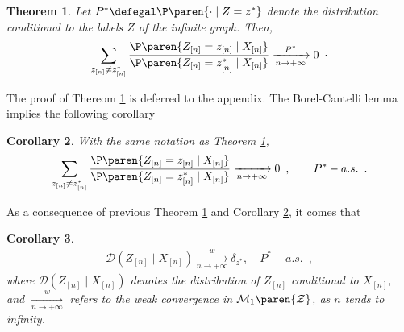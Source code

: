 \documentclass[11pt]{article}
\newtheorem{thm}{Theorem}[section]
\newtheorem{lem}[thm]{Lemma}
\newtheorem{cor}[thm]{Corollary}
\newcommand{\Xn}{X_{[n]}}
\newcommand{\Zn}{Z_{[n]}}
\newcommand{\zn}{z_{[n]}}
\begin{document}
\begin{thm}\label{thm.distrib.conv.zn}
Let $P^*\defegal\P\paren{\cdot\mid Z=z^*}$ denote the distribution  conditional to the labels $Z$ of the infinite graph. Then,
\begin{align*}
        \sum_{\zn\neq \zn^*}\frac{\P\paren{\Zn=\zn\mid \Xn}}{\P\paren{\Zn=\zn^*\mid \Xn}}\xrightarrow[n\to+\infty]{P^*}0\enspace\cdot
\end{align*}
\end{thm}
The proof of Thereom \ref{thm.distrib.conv.zn} is deferred to the appendix.
%
The Borel-Cantelli lemma implies the following corollary
\begin{cor} \label{cor.distrib.conv.as.zn} With the same notation as Theorem
\ref{thm.distrib.conv.zn},
\begin{align*}
\sum_{\zn\neq \zn^*}\frac{\P\paren{\Zn=\zn\mid \Xn}}{\P\paren{\Zn=\zn^*\mid \Xn}}\xrightarrow[n\to+\infty]{}0\enspace,\qquad P^*-a.s.\enspace.  
\end{align*}
\end{cor}





As a consequence of previous Theorem \ref{thm.distrib.conv.zn} and Corollary \ref{cor.distrib.conv.as.zn}, it comes that
\begin{cor}\label{cor.degeneracy.distrib.zn}
\begin{align*}
        \mathcal{D}(\Zn\mid \Xn) \xrightarrow[n\to+\infty]{w} \delta_{z^*},\quad P^*-a.s.\enspace,
\end{align*}
where $\mathcal{D}(\Zn\mid \Xn)$  denotes the distribution of $\Zn$ conditional to $\Xn$, and $\xrightarrow[n\to+\infty]{w}$ refers to the weak convergence in $\mathcal {M}_1\paren{\mathcal{Z}}$, as $n$ tends to infinity.
\end{cor}
\end{document}
